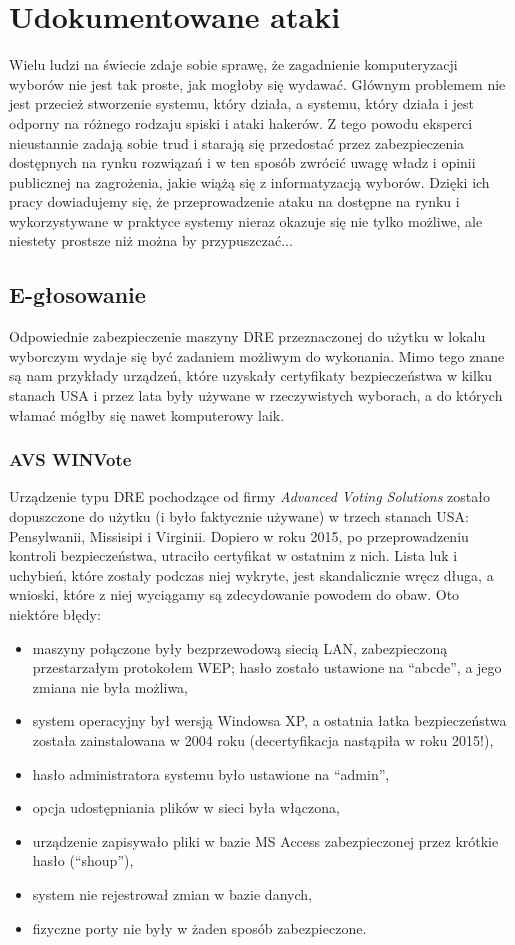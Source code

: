 \documentclass[polish]{kbk}
\begin{document}
\section{Udokumentowane ataki}
Wielu ludzi na świecie zdaje sobie sprawę, że zagadnienie komputeryzacji wyborów nie jest tak proste, jak mogłoby się wydawać. Głównym problemem nie jest przecież stworzenie systemu, który działa, a systemu, który działa i jest odporny na różnego rodzaju spiski i ataki hakerów. Z tego powodu eksperci nieustannie zadają sobie trud i starają się przedostać przez zabezpieczenia dostępnych na rynku rozwiązań i w ten sposób zwrócić uwagę władz i opinii publicznej na zagrożenia, jakie wiążą się z informatyzacją wyborów. Dzięki ich pracy dowiadujemy się, że przeprowadzenie ataku na dostępne na rynku i wykorzystywane w praktyce systemy nieraz okazuje się nie tylko możliwe, ale niestety prostsze niż można by przypuszczać...

\subsection{E-głosowanie} \label{dre-hacks}
Odpowiednie zabezpieczenie maszyny DRE przeznaczonej do użytku w lokalu wyborczym wydaje się być zadaniem możliwym do wykonania. Mimo tego znane są nam przykłady urządzeń, które uzyskały certyfikaty bezpieczeństwa w kilku stanach USA i przez lata były używane w rzeczywistych wyborach, a do których włamać mógłby się nawet komputerowy laik.

\subsubsection{AVS WINVote \cite{winvote}}
Urządzenie typu DRE pochodzące od firmy \textit{Advanced Voting Solutions} zostało dopuszczone do użytku (i było faktycznie używane) w trzech stanach USA: Pensylwanii, Missisipi i Virginii. Dopiero w roku 2015, po przeprowadzeniu kontroli bezpieczeństwa, utraciło certyfikat w ostatnim z nich. Lista luk i uchybień, które zostały podczas niej wykryte, jest skandalicznie wręcz długa, a wnioski, które z niej wyciągamy są zdecydowanie powodem do obaw. Oto niektóre błędy:
\begin{itemize}
\item maszyny połączone były bezprzewodową siecią LAN, zabezpieczoną przestarzałym protokołem WEP; hasło zostało ustawione na ``abcde'', a jego zmiana nie była możliwa,
\item system operacyjny był wersją Windowsa XP, a ostatnia łatka bezpieczeństwa została zainstalowana w 2004 roku (decertyfikacja nastąpiła w roku 2015!),
\item hasło administratora systemu było ustawione na ``admin'',
\item opcja udostępniania plików w sieci była włączona,
\item urządzenie zapisywało pliki w bazie MS Access zabezpieczonej przez krótkie hasło (``shoup''),
\item system nie rejestrował zmian w bazie danych,
\item fizyczne porty nie były w żaden sposób zabezpieczone.
\end{itemize}
\end{document}
